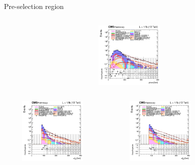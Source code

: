 \documentclass[8pt]{beamer}
\begin{document}
\begin{frame}{Pre-selection region}
\begin{columns}
\begin{column}{0.33\textwidth}
\begin{center}
			\begin{block}{}\end{block}\vspace{10pt}
     			\includegraphics[width=1.0\textwidth, height=90pt]{figs/2018/log_cratio_topCR_ll_METcorrected_pt.png}
    		\end{center}		
		\end{column}
\end{columns}
\begin{columns}
		\begin{column}{0.33\textwidth}
			\begin{center}
     			\includegraphics[width=1.0\textwidth, height=90pt]{figs/2016/log_cratio_topCR_ll_mt2ll.png}
    		\end{center}		
		\end{column}
		\begin{column}{0.33\textwidth}
			\begin{center}
     			\includegraphics[width=1.0\textwidth, height=90pt]{figs/2017/log_cratio_topCR_ll_mt2ll.png}
    		\end{center}		
		\end{column}
		\begin{column}{0.33\textwidth}
			\begin{center}

\end{center}
\end{column}
\end{columns}
\end{frame}
\end{document}
